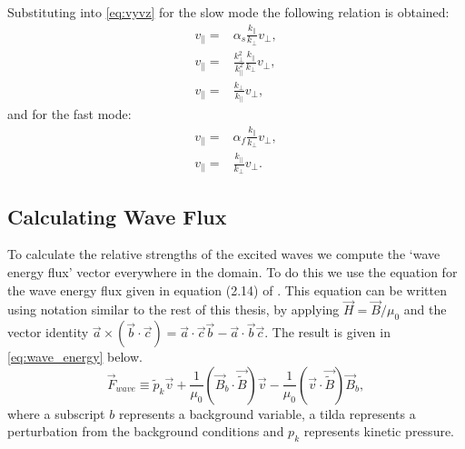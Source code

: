 Substituting into \cref{eq:vyvz} for the slow mode the following relation is obtained:
\begin{align}
    v_\parallel =& \alpha_s \frac{k_\parallel}{k_\perp}v_\perp,\\
    v_\parallel =& \frac{k^2_\perp}{k^2_\parallel}\frac{k_\parallel}{k_\perp}v_\perp,\\
    v_\parallel =& \frac{k_\perp}{k_\parallel}v_\perp,
\end{align}
and for the fast mode:
\begin{align}
    v_\parallel =& \alpha_f \frac{k_\parallel}{k_\perp}v_\perp,\\
    v_\parallel =& \frac{k_\parallel}{k_\perp}v_\perp.
\end{align}

\subsection{Calculating Wave Flux}\label{sec:waveflux}

To calculate the relative strengths of the excited waves we compute the `wave energy flux' vector everywhere in the domain.
To do this we use the equation for the wave energy flux given in equation (2.14) of \cite{leroy1985}.
This equation can be written using notation similar to the rest of this thesis, by applying $\vec{H} = \vec{B}/\mu_0$ and the vector identity $\vec{a} \times (\vec{b} \cdot \vec{c}) = \vec{a} \cdot \vec{c}\vec{b} - \vec{a} \cdot \vec{b}\vec{c}$.
The result is given in \cref{eq:wave_energy} below.
\begin{equation}
\vec{F}_{wave} \equiv \widetilde{p}_k \vec{v} + \frac{1}{\mu_0} \left(\vec{B}_b \cdot \vec{\widetilde{B}}\right) \vec{v} - \frac{1}{\mu_0}\left(\vec{v} \cdot \vec{\widetilde{B}} \right) \vec{B}_b,
\label{eq:wave_energy}
\end{equation}
where a subscript $b$ represents a background variable, a tilda represents a perturbation from the background conditions and $p_k$ represents kinetic pressure.

